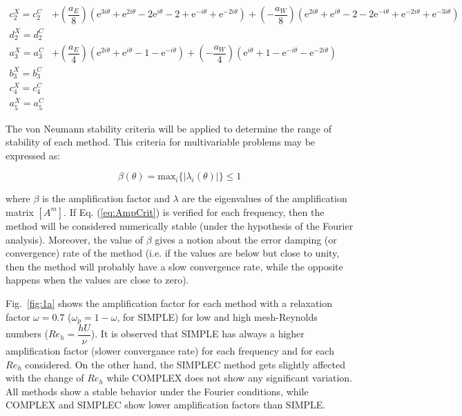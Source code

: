 \documentclass[final,3p,times,11pt,onecolumn]{myElsarticle}
\numberwithin{equation}{section}
\begin{document}
\begin{equation}
\begin{split}
     c^X_2 = c_2^C &+ \left(\dfrac{a_E}{8}\right) \left(\text{e}^{3 i \theta} + \text{e}^{2 i \theta} - 2 \text{e}^{i \theta} - 2 + \text{e}^{-i \theta} + \text{e}^{-2 i \theta}\right) + \left(-\dfrac{a_W}{8}\right) \left(\text{e}^{2 i \theta} + \text{e}^{i \theta} - 2 - 2 \text{e}^{-i \theta} + \text{e}^{-2 i \theta} + \text{e}^{-3 i \theta}\right) \\
     d^X_2 = d^C_2& \\
     a^X_3 = a^C_3 &+ \left(\dfrac{a_E}{4}\right) \left(\text{e}^{2 i \theta} + \text{e}^{i \theta} - 1 - \text{e}^{-i \theta} \right) + \left(-\dfrac{a_W}{4}\right) \left(\text{e}^{i \theta} + 1 - \text{e}^{- i \theta} - \text{e}^{-2 i \theta} \right) \\
     b^X_3 = b_3^C& \\ 
     c^X_4 = c^C_4& \\
     a^X_5 = a^C_5&     
\end{split}
\end{equation}

The von Neumann stability criteria \cite{hirsch} will be applied to determine the range of stability of each method. This criteria for multivariable problems may be expressed as:

\begin{equation}
\beta(\theta) = \text{max}_i \{ |\lambda_i(\theta)| \} \leq 1
\label{eq:AmpCrit}
\end{equation}

\noindent where $\beta$ is the amplification factor and $\lambda$ are the eigenvalues of the amplification matrix $[A^m]$. If Eq. (\ref{eq:AmpCrit}) is verified for each frequency, then the method will be considered numerically stable (under the hypothesis of the Fourier analysis). Moreover, the value of $\beta$ gives a notion about the error damping (or convergence) rate of the method (i.e. if the values are below but close to unity, then the method will probably have a slow convergence rate, while the opposite happens when the values are close to zero).

Fig.~\ref{fig:1a} shows the amplification factor for each method with a relaxation factor $\omega=0.7$ ($\omega_p=1-\omega$, for SIMPLE) for low and high mesh-Reynolds numbers ($Re_h = \dfrac{h U}{\nu}$). It is observed that SIMPLE has always a higher amplification factor (slower convergance rate) for each frequency and for each $Re_h$ considered. On the other hand, the SIMPLEC method gets slightly affected with the change of $Re_h$ while COMPLEX does not show any significant variation. All methods show a stable behavior under the Fourier conditions, while COMPLEX and SIMPLEC show lower amplification factors than SIMPLE. 
\end{document}
